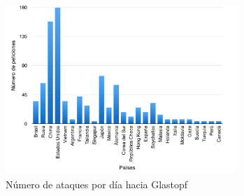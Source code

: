 \documentclass[journal]{IEEEtran}
\begin{document}
\begin{figure}[H]
\centerline{
\includegraphics[width=8.8cm]{img/glastopf}
}
\caption{Número de ataques por día hacia Glastopf}
\label{fig:sesion_atacante}
\end{figure}
\end{document}
